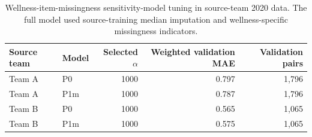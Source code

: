 \begin{table}[htbp]
\centering
\caption{Missingness of current-day readiness/wellness variables and next-day readiness in the calendar player-day panel, by team and year. Values are percentages of player-days with missing values.}
\scriptsize
{}
\end{table}

\begin{table}[htbp]
\centering
\caption{Wellness-item-missingness sensitivity-model tuning in source-team 2020 data. The full model used source-training median imputation and wellness-specific missingness indicators.}
\scriptsize
\begin{tabular}{llrrr}
\toprule
Source team & Model & Selected $\alpha$ & Weighted validation MAE & Validation pairs \\
\midrule
Team A & P0 & 1000 & 0.797 & 1,796 \\
Team A & P1m & 1000 & 0.787 & 1,796 \\
Team B & P0 & 1000 & 0.565 & 1,065 \\
Team B & P1m & 1000 & 0.575 & 1,065 \\
\bottomrule
\end{tabular}
\end{table}


